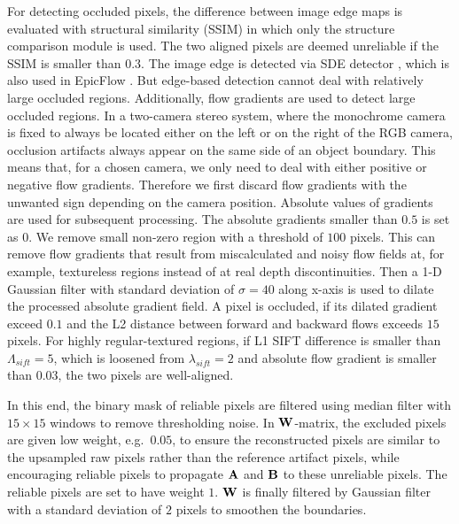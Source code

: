 For detecting occluded pixels, the difference between image edge maps is evaluated with structural similarity (SSIM) \cite{Wang:2004:IQA} in which only the structure comparison module is used. 
The two aligned
	pixels are deemed unreliable if the SSIM is smaller than $0.3$.  The
	image edge is detected via SDE detector \cite{Dollar:2013:SDE}, which
	is also used in EpicFlow
	\cite{revaud:2015:FLOW}. But edge-based
	detection cannot deal with relatively large occluded regions.  Additionally, flow gradients are used to detect large occluded regions. In a
	two-camera stereo system, where the monochrome camera is fixed to
	always be located either on the left or on the right of the RGB
	camera, occlusion artifacts always appear on the same side of an
	object boundary. This means that, for a chosen camera, we only need to deal with 
	either positive or negative flow gradients. Therefore we
	first discard flow gradients with the unwanted sign depending on the
	camera position. Absolute values of gradients are used for subsequent
	processing.  The absolute gradients smaller than $0.5$ is set as
	$0$. We remove small non-zero region with a threshold of $100$
	pixels. This can remove flow gradients that result from miscalculated
	and noisy flow fields at, for example, textureless regions instead of
	at real depth discontinuities.  Then a 1-D Gaussian filter with
	standard deviation of $\sigma=40$ along x-axis is used to dilate the
	processed absolute gradient field. A pixel is occluded, if its dilated
	gradient exceed $0.1$ and the L2 distance between forward and backward flows 
	exceeds $15$ pixels. 
 	For highly regular-textured regions, 
	if L1 SIFT difference is smaller than $\Lambda_{sift}=5$, which is loosened from 
	$\lambda_{sift}=2$ and absolute flow gradient is smaller than $0.03$, the two 
	pixels are well-aligned.
	
	In this end, the 
	binary mask of reliable pixels are filtered using median filter with $15 \times 
	15$ windows to remove thresholding noise. In $\mathbf{W}$-matrix, the excluded pixels 
	are given low weight, e.g.\ $0.05$, to ensure the reconstructed pixels are 
	similar to the upsampled raw pixels rather than the reference artifact pixels, 
	while encouraging reliable pixels to propagate $\mathbf{A}$ and $\mathbf{B}$ to these 
	unreliable pixels.  The reliable pixels are set to have weight $1$. $\mathbf{W}$ is 
	finally filtered by Gaussian filter with a standard deviation of $2$ pixels to 
	smoothen the boundaries.
	
	
